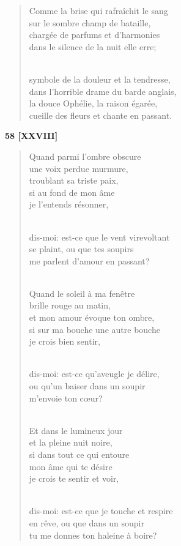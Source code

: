 \documentclass[a4paper,11pt]{book}
\begin{document}
\begin{verse}
Comme la brise qui rafraîchit le sang \\
sur le sombre champ de bataille, \\
chargée de parfums et d'harmonies \\
dans le silence de la nuit elle erre; \\ \

symbole de la douleur et la tendresse, \\
dans l'horrible drame du barde anglais, \\
la douce Ophélie, la raison égarée, \\
cueille des fleurs et chante en passant. \\
\end{verse}

\bigskip

\begin{center} {\bf 58 [XXVIII]} \end{center}

\begin{verse}
Quand parmi l'ombre obscure \\
une voix perdue murmure, \\
troublant sa triste paix, \\
si au fond de mon âme \\
je l'entends résonner, \\ \

dis-moi: est-ce que le vent virevoltant \\
se plaint, ou que tes soupirs \\
me parlent d'amour en passant? \\ \

Quand le soleil à ma fenêtre \\
brille rouge au matin, \\
et mon amour évoque ton ombre, \\
si sur ma bouche une autre bouche \\
je crois bien sentir, \\ \

dis-moi: est-ce qu'aveugle je délire, \\
ou qu'un baiser dans un soupir \\
m'envoie ton c{\oe}ur? \\ \

Et dans le lumineux jour \\
et la pleine nuit noire, \\
si dans tout ce qui entoure \\
mon âme qui te désire \\
je crois te sentir et voir, \\ \

dis-moi: est-ce que je touche et respire \\
en rêve, ou que dans un soupir \\
tu me donnes ton haleine à boire? \\
\end{verse}
\end{document}

